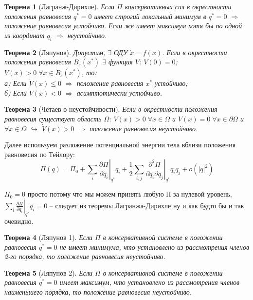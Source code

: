 \documentclass[12pt, a4paper]{article}
\theoremstyle{plain}
\newtheorem{theorem}{Теорема}[section] %
\theoremstyle{definition}
\theoremstyle{remark}
\begin{document}
\begin{theorem}[Лагранж-Дирихле]
Если $\Pi$ консервативных сил в окрестности положения равновесия $q^* = 0$ имеет строгий локальный минимум в $q^* = 0$ $\Rightarrow$ положение равновесия устойчиво. Если же имеет максимум хотя бы по одной из координат $q_i$ $\Rightarrow$ неустойчиво.
\end{theorem}

\begin{theorem}[Ляпунов]
Допустим, $\exists$ ОДУ $\dot{x} = f(x)$. Если в окрестности положения равновесия $B_{\varepsilon}(x^*)$ $\exists$ функция $V$: $V(0) = 0$; $V(x) > 0 \; \forall x \in \mathring{B}_{\varepsilon}(x^*)$, то:\\
а) Если $\dot{V}(x) \leqslant 0$ $\Rightarrow$ положение равновесия $x^*$ устойчиво; \\
б) Если $\dot{V}(x) < 0$ $\Rightarrow$ асимптотически устойчиво.
\end{theorem}

\begin{theorem}[Четаев о неустойчивости]
Если в окрестности положения равновесия существует область $\Omega$: $V(x) > 0 \; \forall x \in \Omega$ и $V(x) = 0 \; \forall x \in \partial\Omega$ и $\forall x \in \Omega$ $\hookrightarrow$ $\dot{V}(x) > 0$ $\Rightarrow$ положение равновесия неустойчиво.
\end{theorem}

Далее используем разложение потенциальной энергии тела вблизи положения равновесия по Тейлору:
$$\Pi(q) = \Pi_0 + \sum_i \left.\frac{\partial \Pi}{\partial q_i}\right|_{q^*} q_i + \frac{1}{2} \sum_{i,j} \left.\frac{\partial^2 \Pi}{\partial q_i \partial q_j}\right|_{q^*} q_i q_j + o(|q|^2)$$

$\Pi_0 = 0$ просто потому что мы можем принять любую П за нулевой уровень, $\sum_i \left.\frac{\partial \Pi}{\partial q_i}\right|_{q^*} q_i = 0$ -- следует из теоремы Лагранжа-Дирихле ну и как будто бы и так очевидно.

\begin{theorem}[Ляпунов 1]
Если $\Pi$ в консервативной системе в положении равновесия $q^* = 0$ не имеет минимума, что установлено из рассмотрения членов 2-го порядка, то положение равновесия неустойчиво.
\end{theorem}

\begin{theorem}[Ляпунов 2]
Если $\Pi$ в консервативной системе в положении равновесия $q^* = 0$ имеет максимум, что установлено из рассмотрения членов наименьшего порядка, то положение равновесия неустойчиво.
\end{theorem}
\end{document}
